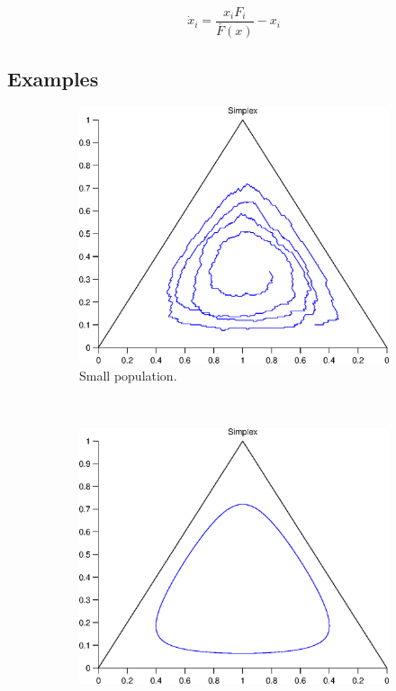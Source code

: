 \documentclass[a4paper,10pt]{article}
\begin{document}
\begin{equation}
\dot{x}_i = \frac{ x_i F_i }{ \bar{F}(x) } - x_i
\end{equation}





\subsection{Examples}



\begin{figure}[th]
  \centering
  \begin{subfigure}[b]{0.4\textwidth}
	  \includegraphics[width=\textwidth]{./images/test_finite_proportional_imitation.eps}
	  \caption{Small population.}
	  \label{fig:finite1_protocol}
  \end{subfigure}
  ~ 
  \begin{subfigure}[b]{0.4\textwidth}
	  \includegraphics[width=\textwidth]{./images/test1_simplex_rd.eps}

\end{subfigure}
\end{figure}
\end{document}
